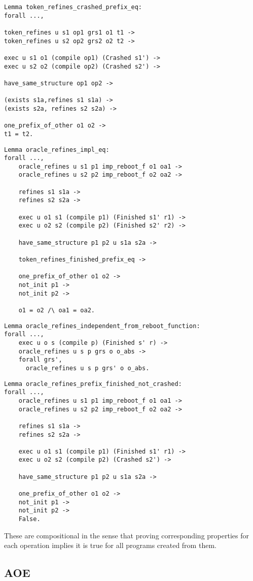 \begin{verbatim}
Lemma token_refines_crashed_prefix_eq:
forall ...,

token_refines u s1 op1 grs1 o1 t1 ->
token_refines u s2 op2 grs2 o2 t2 ->

exec u s1 o1 (compile op1) (Crashed s1') ->
exec u s2 o2 (compile op2) (Crashed s2') ->

have_same_structure op1 op2 -> 

(exists s1a,refines s1 s1a) ->
(exists s2a, refines s2 s2a) ->

one_prefix_of_other o1 o2 ->
t1 = t2.
\end{verbatim}

\begin{verbatim}
Lemma oracle_refines_impl_eq:
forall ...,
    oracle_refines u s1 p1 imp_reboot_f o1 oa1 ->
    oracle_refines u s2 p2 imp_reboot_f o2 oa2 ->
    
    refines s1 s1a ->
    refines s2 s2a ->
    
    exec u o1 s1 (compile p1) (Finished s1' r1) ->
    exec u o2 s2 (compile p2) (Finished s2' r2) ->
    
    have_same_structure p1 p2 u s1a s2a ->
    
    token_refines_finished_prefix_eq ->
    
    one_prefix_of_other o1 o2 ->
    not_init p1 ->
    not_init p2 ->
    
    o1 = o2 /\ oa1 = oa2.
\end{verbatim}

\begin{verbatim}
Lemma oracle_refines_independent_from_reboot_function:
forall ...,
    exec u o s (compile p) (Finished s' r) ->
    oracle_refines u s p grs o o_abs ->
    forall grs', 
      oracle_refines u s p grs' o o_abs.
\end{verbatim}

\begin{verbatim}
Lemma oracle_refines_prefix_finished_not_crashed:
forall ...,
    oracle_refines u s1 p1 imp_reboot_f o1 oa1 ->
    oracle_refines u s2 p2 imp_reboot_f o2 oa2 ->
    
    refines s1 s1a ->
    refines s2 s2a ->
    
    exec u o1 s1 (compile p1) (Finished s1' r1) ->
    exec u o2 s2 (compile p2) (Crashed s2') ->
    
    have_same_structure p1 p2 u s1a s2a ->
    
    one_prefix_of_other o1 o2 ->
    not_init p1 ->
    not_init p2 ->
    False.
\end{verbatim}

These are compositional in the sense that proving corresponding properties for 
each operation implies it is true for all programs created from them. 

\subsection{AOE}
\fi